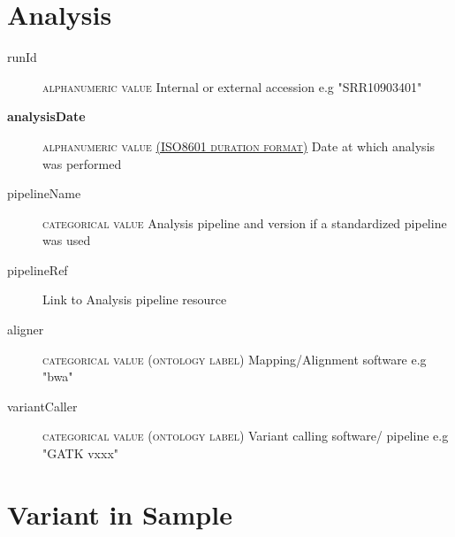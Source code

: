 \documentclass[a4paper, 10pt]{article}        %
\begin{document}
 
 
   \section*{ {\color{teal} Analysis}}
  
  \begin{description}
	\item[runId] {\textsc{alphanumeric value}}  Internal or external accession e.g "SRR10903401"
	\item[\textbf{analysisDate}] {\textsc{alphanumeric value \href{https://www.iso.org/iso-8601-date-and-time-format.html}{(ISO8601 duration format)}}} Date at which analysis was performed  
	\item[pipelineName]  {\textsc{categorical value}} Analysis pipeline and version if a standardized pipeline was used
	\item[pipelineRef]  Link to Analysis pipeline resource
	\item[aligner]  {\textsc{categorical value (ontology label)}} Mapping/Alignment software e.g "bwa"
	  \item[variantCaller]  {\textsc{categorical value (ontology label)}} Variant calling software/ pipeline e.g "GATK vxxx" %
 \end{description}
 
 
 
   \section*{ {\color{teal} Variant in Sample}}
  
\end{document}
